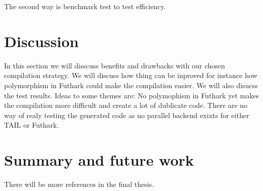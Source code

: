 \documentclass[11pt]{article}
\begin{document}
The second way is benchmark test to test efficiency. 


\section{Discussion}
In this section we will disscuss benefits and drawbacks with our chosen compilation strategy. We will discuss how thing can be inproved for instance how polymorphism in Futhark could make the compilation easier. We will also disucss the test results. Ideas to some themes are: No polymophism in Futhark yet makes the compilation more difficult and create a lot of dublicate code. There are no way of realy testing the generated code as no parallel backend exixts for either TAIL or Futhark.

\section{Summary and future work}




{}


There will be more references in the final thesis. 
\end{document}
